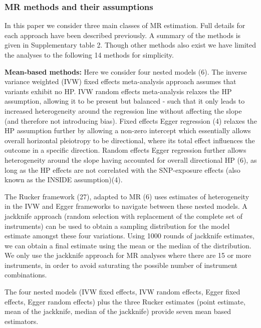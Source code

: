 \documentclass[]{article}
\begin{document}
\subsubsection{MR methods and their
assumptions}\label{mr-methods-and-their-assumptions}

In this paper we consider three main classes of MR estimation. Full
details for each approach have been described previously. A summary of
the methods is given in Supplementary table 2. Though other methods also
exist we have limited the analyses to the following 14 methods for
simplicity.

\textbf{Mean-based methods:} Here we consider four nested models (6).
The inverse variance weighted (IVW) fixed effects meta-analysis approach
assumes that variants exhibit no HP. IVW random effects meta-analysis
relaxes the HP assumption, allowing it to be present but balanced - such
that it only leads to increased heterogeneity around the regression line
without affecting the slope (and therefore not introducing bias). Fixed
effects Egger regression (4) relaxes the HP assumption further by
allowing a non-zero intercept which essentially allows overall
horizontal pleiotropy to be directional, where its total effect
influences the outcome in a specific direction. Random effects Egger
regression further allows heterogeneity around the slope having
accounted for overall directional HP (6), as long as the HP effects are
not correlated with the SNP-exposure effects (also known as the INSIDE
assumption)(4).

The Rucker framework (27), adapted to MR (6) uses estimates of
heterogeneity in the IVW and Egger frameworks to navigate between these
nested models. A jackknife approach (random selection with replacement
of the complete set of instruments) can be used to obtain a sampling
distribution for the model estimate amongst these four variations. Using
1000 rounds of jackknife estimates, we can obtain a final estimate using
the mean or the median of the distribution. We only use the jackknife
approach for MR analyses where there are 15 or more instruments, in
order to avoid saturating the possible number of instrument
combinations.

The four nested models (IVW fixed effects, IVW random effects, Egger
fixed effects, Egger random effects) plus the three Rucker estimates
(point estimate, mean of the jackknife, median of the jackknife) provide
seven mean based estimators.
\end{document}
